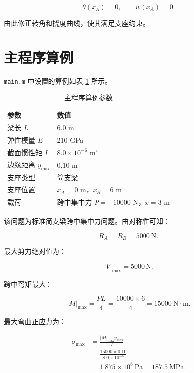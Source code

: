\documentclass[UTF8,a4paper,12pt]{ctexart}
\numberwithin{equation}{section}
\begin{document}
\begin{equation}
\theta(x_A)=0,\qquad w(x_A)=0.
\end{equation}

由此修正转角和挠度曲线，使其满足支座约束。

\section{主程序算例}

\verb|main.m| 中设置的算例如表 \ref{tab:main-case} 所示。

\begin{table}[H]
\centering
\caption{主程序算例参数}
\label{tab:main-case}
\begin{tabular}{ll}
\toprule
参数 & 数值 \\
\midrule
梁长 $L$ & 6.0 m \\
弹性模量 $E$ & 210 GPa \\
截面惯性矩 $I$ & $8.0\times10^{-6}$ m$^4$ \\
边缘距离 $y_{\max}$ & 0.10 m \\
支座类型 & 简支梁 \\
支座位置 & $x_A=0$ m，$x_B=6$ m \\
载荷 & 跨中集中力 $P=-10000$ N，$x=3$ m \\
\bottomrule
\end{tabular}
\end{table}

该问题为标准简支梁跨中集中力问题。由对称性可知：

\begin{equation}
R_A=R_B=5000\ \text{N}.
\end{equation}

最大剪力绝对值为：

\begin{equation}
|V|_{\max}=5000\ \text{N}.
\end{equation}

跨中弯矩最大：

\begin{equation}
|M|_{\max}=\frac{PL}{4}=\frac{10000\times6}{4}=15000\ \text{N}\cdot\text{m}.
\end{equation}

最大弯曲正应力为：

\begin{align}
\sigma_{\max}
&=\frac{|M|_{\max}y_{\max}}{I}\\
&=\frac{15000\times0.10}{8.0\times10^{-6}}\\
&=1.875\times10^8\ \text{Pa}=187.5\ \text{MPa}.
\end{align}
\end{document}
